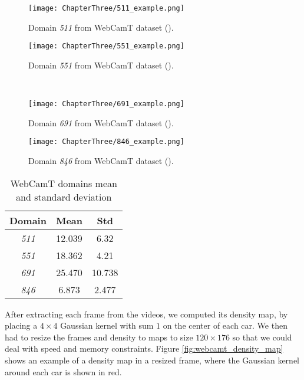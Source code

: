 \begin{figure}[!ht]
	\centering
	\begin{minipage}[b]{0.4\textwidth}
		\texttt{[image: ChapterThree/511\_example.png]}
		\caption{Domain \textit{511} from WebCamT dataset (\citet{Zhang2017b}).}
		\label{fig:webcamt_511}
	\end{minipage}
	\hfill
	\begin{minipage}[b]{0.4\textwidth}
		\texttt{[image: ChapterThree/551\_example.png]}
		\caption{Domain \textit{551} from WebCamT dataset (\citet{Zhang2017b}).}
		\label{fig:webcamt_551}
	\end{minipage} \\
	\vspace{1cm}
	\begin{minipage}[b]{0.4\textwidth}
		\texttt{[image: ChapterThree/691\_example.png]}
		\caption{Domain \textit{691} from WebCamT dataset (\citet{Zhang2017b}).}
		\label{fig:webcamt_691}
	\end{minipage} 
	\hfill
	\begin{minipage}[b]{0.4\textwidth}
		\texttt{[image: ChapterThree/846\_example.png]}
		\caption{Domain \textit{846} from WebCamT dataset (\citet{Zhang2017b}).}
		\label{fig:webcamt_846}
	\end{minipage}
\end{figure}

\begin{table}[!ht]
	\centering
	\begin{tabular}{|c|c|c|}
		\hline
		\textbf{Domain} & \textbf{Mean} & \textbf{Std}  \\
		\hline
		\textit{511} & 12.039 & 6.32 \\
		\hline
		\textit{551} & 18.362 & 4.21 \\
		\hline
		\textit{691} & 25.470 & 10.738 \\
		\hline
		\textit{846} & 6.873 & 2.477 \\
		\hline
	\end{tabular}
	\caption{WebCamT domains mean and standard deviation}
	\label{tab:webcamt_domains}
\end{table}

After extracting each frame from the videos, we computed its density map, by placing a $4\times4$ Gaussian kernel with sum $1$ on the center of each car. We then had to resize the frames and density to maps to size $120\times 176$ so that we could deal with speed and memory constraints. Figure \ref{fig:webcamt_density_map} shows an example of a density map in a resized frame, where the Gaussian kernel around each car is shown in red.

